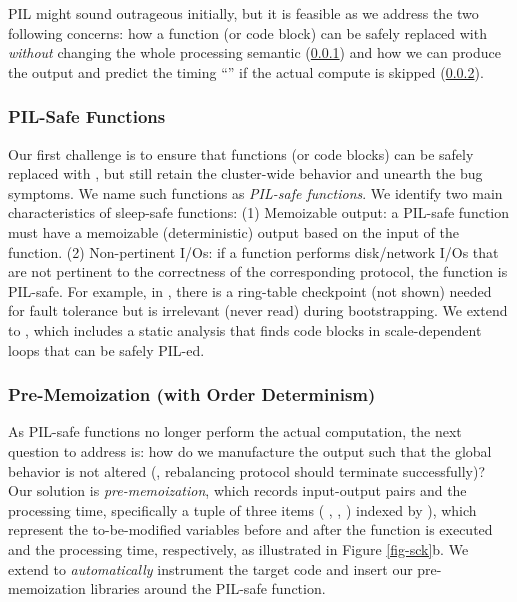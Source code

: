 PIL might sound outrageous initially, but it is feasible as we
address the two following concerns:
%
how a function (or code block) can be safely replaced with \sleep
\textit{without} changing the whole processing semantic
(\sec\ref{sc-pil-1}) and
%
how we can produce the output and predict the timing
``'' if the actual compute is skipped (\sec\ref{sc-pil-2}).




\subsubsection{PIL-Safe Functions}
\label{sc-pil-1}

Our first challenge is to ensure that functions (or code blocks) can be
safely replaced with \sleep, but still retain the cluster-wide behavior
and unearth the bug symptoms.  We name such functions as {\em PIL-safe
  functions}.
%
We identify two main characteristics of sleep-safe functions:
(1) Memoizable output: a PIL-safe function must have a memoizable
(deterministic) output based on the input of the function.
(2) Non-pertinent I/Os: if a function performs disk/network I/Os that are
not pertinent to the correctness of the corresponding protocol, the
function is PIL-safe.  For example, in \caone, there is a ring-table
checkpoint (not shown) needed for fault tolerance but is irrelevant (never
read) during bootstrapping.
%
We extend \sfind to \sfindp, which includes a static analysis that finds
code blocks in scale-dependent loops that can be safely PIL-ed.




\subsubsection{Pre-Memoization (with Order Determinism)}
\label{sc-pil-2}


As PIL-safe functions no longer perform the actual computation, the next
question to address is: how do we manufacture the output such that the
global behavior is not altered (\eg, rebalancing protocol should terminate
successfully)?
%
Our solution is {\em pre-memoization}, which records input-output pairs
and the processing time, specifically a tuple of three items
( , ,  ) indexed by
), which represent the to-be-modified variables before and
after the function is executed and the processing time, respectively, as
illustrated in Figure \ref{fig-sck}b.
%
We extend \sfindp to {\em automatically} instrument the target code and insert
our pre-memoization libraries around the PIL-safe function.


